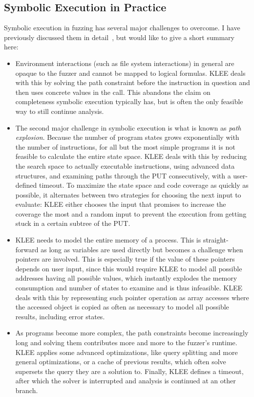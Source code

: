 \documentclass{article}
\let\savedCite=\cite
\renewcommand{\cite}{\unskip~\savedCite}
\begin{document}
\begin{multicols}{2}
    \subsection{Symbolic Execution in Practice}
    Symbolic execution in fuzzing has several major challenges to overcome. I have previously discussed them in detail\cite{EVA}, but would like to give a short summary here:

    \begin{itemize}
        \item Environment interactions (such as file system interactions) in general are opaque to the fuzzer and cannot be mapped to logical formulas. KLEE deals with this by solving the path constraint before the instruction in question and then uses concrete values in the call. This abandons the claim on completeness symbolic execution typically has, but is often the only feasible way to still continue analysis.
        \item The second major challenge in symbolic execution is what is known as \textit{path explosion}. Because the number of program states grows exponentially with the number of instructions, for all but the most simple programs it is not feasible to calculate the entire state space. KLEE deals with this by reducing the search space to actually executable instructions, using advanced data structures, and examining paths through the PUT consecutively, with a user-defined timeout. To maximize the state space and code coverage as quickly as possible, it alternates between two strategies for choosing the next input to evaluate: KLEE either chooses the input that promises to increase the coverage the most and a random input to prevent the execution from getting stuck in a certain subtree of the PUT.
        \item KLEE needs to model the entire memory of a process. This is straight-forward as long as variables are used directly but becomes a challenge when pointers are involved. This is especially true if the value of these pointers depends on user input, since this would require KLEE to model all possible addresses having all possible values, which instantly explodes the memory consumption and number of states to examine and is thus infeasible. KLEE deals with this by representing such pointer operation as array accesses where the accessed object is copied as often as necessary to model all possible results, including error states.
        \item As programs become more complex, the path constraints become increasingly long and solving them contributes more and more to the fuzzer's runtime. KLEE applies some advanced optimizations, like query splitting and more general optimizations, or a cache of previous results, which often solve supersets the query they are a solution to. Finally, KLEE defines a timeout, after which the solver is interrupted and analysis is continued at an other branch.
    \end{itemize}


\end{multicols}
\end{document}

